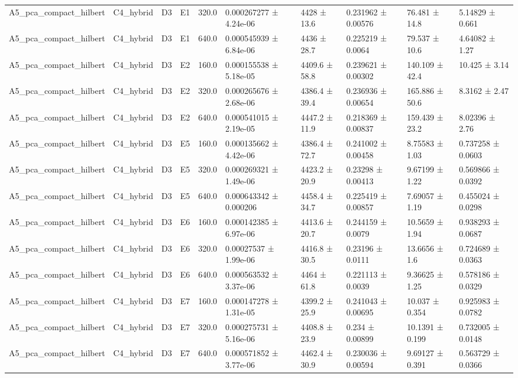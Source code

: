 \begin{table}
\begin{tabular}{llllllllll}
A5\_pca\_compact\_hilbert & C4\_hybrid & D3 & E1 & 320.0 & 0.000267277 ± 4.24e-06 & 4428 ± 13.6 & 0.231962 ± 0.00576 & 76.481 ± 14.8 & 5.14829 ± 0.661 \\
A5\_pca\_compact\_hilbert & C4\_hybrid & D3 & E1 & 640.0 & 0.000545939 ± 6.84e-06 & 4436 ± 28.7 & 0.225219 ± 0.0064 & 79.537 ± 10.6 & 4.64082 ± 1.27 \\
A5\_pca\_compact\_hilbert & C4\_hybrid & D3 & E2 & 160.0 & 0.000155538 ± 5.18e-05 & 4409.6 ± 58.8 & 0.239621 ± 0.00302 & 140.109 ± 42.4 & 10.425 ± 3.14 \\
A5\_pca\_compact\_hilbert & C4\_hybrid & D3 & E2 & 320.0 & 0.000265676 ± 2.68e-06 & 4386.4 ± 39.4 & 0.236936 ± 0.00654 & 165.886 ± 50.6 & 8.3162 ± 2.47 \\
A5\_pca\_compact\_hilbert & C4\_hybrid & D3 & E2 & 640.0 & 0.000541015 ± 2.19e-05 & 4447.2 ± 11.9 & 0.218369 ± 0.00837 & 159.439 ± 23.2 & 8.02396 ± 2.76 \\
A5\_pca\_compact\_hilbert & C4\_hybrid & D3 & E5 & 160.0 & 0.000135662 ± 4.42e-06 & 4386.4 ± 72.7 & 0.241002 ± 0.00458 & 8.75583 ± 1.03 & 0.737258 ± 0.0603 \\
A5\_pca\_compact\_hilbert & C4\_hybrid & D3 & E5 & 320.0 & 0.000269321 ± 1.49e-06 & 4423.2 ± 20.9 & 0.23298 ± 0.00413 & 9.67199 ± 1.22 & 0.569866 ± 0.0392 \\
A5\_pca\_compact\_hilbert & C4\_hybrid & D3 & E5 & 640.0 & 0.000643342 ± 0.000206 & 4458.4 ± 34.7 & 0.225419 ± 0.00857 & 7.69057 ± 1.19 & 0.455024 ± 0.0298 \\
A5\_pca\_compact\_hilbert & C4\_hybrid & D3 & E6 & 160.0 & 0.000142385 ± 6.97e-06 & 4413.6 ± 20.7 & 0.244159 ± 0.0079 & 10.5659 ± 1.94 & 0.938293 ± 0.0687 \\
A5\_pca\_compact\_hilbert & C4\_hybrid & D3 & E6 & 320.0 & 0.00027537 ± 1.99e-06 & 4416.8 ± 30.5 & 0.23196 ± 0.0111 & 13.6656 ± 1.6 & 0.724689 ± 0.0363 \\
A5\_pca\_compact\_hilbert & C4\_hybrid & D3 & E6 & 640.0 & 0.000563532 ± 3.37e-06 & 4464 ± 61.8 & 0.221113 ± 0.0039 & 9.36625 ± 1.25 & 0.578186 ± 0.0329 \\
A5\_pca\_compact\_hilbert & C4\_hybrid & D3 & E7 & 160.0 & 0.000147278 ± 1.31e-05 & 4399.2 ± 25.9 & 0.241043 ± 0.00695 & 10.037 ± 0.354 & 0.925983 ± 0.0782 \\
A5\_pca\_compact\_hilbert & C4\_hybrid & D3 & E7 & 320.0 & 0.000275731 ± 5.16e-06 & 4408.8 ± 23.9 & 0.234 ± 0.00899 & 10.1391 ± 0.199 & 0.732005 ± 0.0148 \\
A5\_pca\_compact\_hilbert & C4\_hybrid & D3 & E7 & 640.0 & 0.000571852 ± 3.77e-06 & 4462.4 ± 30.9 & 0.230036 ± 0.00594 & 9.69127 ± 0.391 & 0.563729 ± 0.0366 \\

\end{tabular}
\end{table}
